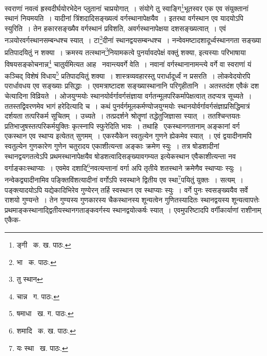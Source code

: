 \documentclass[11pt, openany]{book}
\begin{document}
{\noindent स्वराणां नवत्वं ह्रस्वदीर्घयोरभेदेन प्लुतानां चाप्रयोगात्~। संयोगे तु स्वाङ्गि\renewcommand{\thefootnote}{१}\footnote{ङ्गी \textendash\ क. ख. पाठः.}भूतस्वर एक एव संयुक्तानां स्थानं नियमयति~। यादीनां त्रिंशदादिसङ्ख्यत्वं वर्गस्थानापेक्षयैव~। इतरथा वर्गस्थान एव यादयोऽपि स्युरिति~। तेन हकारसङ्ख्यैव वर्गस्थानं प्रविशति, अवर्गस्थानापेक्षया दशसङ्ख्यत्वात्~। एवं नञयोरवर्गस्थानसम्बन्धश्च स्यात्~। टा\renewcommand{\thefootnote}{२}\footnote{भा \textendash\ क. पाठः.}दीनां स्थानद्वयसम्बन्धश्च~। नन्वेवमष्टादशादूर्ध्वस्थानगता सङ्ख्या प्रतिपादयितुं न शक्या~। क्रमस्य तत्स्थान\renewcommand{\thefootnote}{३}\footnote{तु स्थान}नियामकत्वे पुनर्यावदपेक्षं वक्तुं शक्या, इत्यस्याः परिभाषाया विषयसङ्कोचनान्न\renewcommand{\thefootnote}{४}\footnote{चान्न \textendash\ ग. पाठः.} चातुर्यमित्यत आह \textendash\ {\qt नवान्त्यवर्गे वेति}~। नवानां वर्गस्थानानामन्त्ये वर्गे वा स्वराणां यं कञ्चिद् विशेषं विधाय\renewcommand{\thefootnote}{५}\footnote{षमाधा \textendash\ ख. ग. पाठः.} प्रतिपादयितुं शक्या~। शास्त्रव्यवहारस्तु परार्धादूर्ध्वं न प्रसरति~। लोकवेदयोरपि परार्धावधय एव सङ्ख्याः प्रसिद्धाः~। एवमत्राष्टादश सङ्ख्यास्थानानि परिगृहीतानि~। अतस्तदंश एवैकं दश चेत्यादिना विव्रियते~। ओजयुग्मयोः स्थानयोर्वर्गावर्गसंज्ञाया
वर्गतन्मूलपरिकर्मापेक्षत्वात् तदप्यत्र सूच्यते~। ततस्तद्विवरणमेव भागं हरेदित्यादि च~। कथं पुनर्वर्गमूलकर्मण्योजयुग्मयोः
स्थानयोर्वर्गावर्गसंज्ञाप्रसिद्धिमात्रं दर्शयता तत्परिकर्म सूचितम्~। उच्यते~। तत्प्रदर्शने श्रोतॄणां तद्धेतुजिज्ञासा स्यात्~। ततश्चिन्तयतः प्रतिभाजुषस्तत्परिकर्मयुक्तिः कृत्स्नापि स्फुरेदिति भावः~। तथाहि \textendash\ एकस्थानगतानाम् अङ्कानां वर्ग एकस्थान एव स्थाप्य इत्येतत् सुगमम्~। एकस्यैकेन स्वतुल्येन गुणने ह्येकमेव स्यात्~। एवं द्वयादीनामपि स्वतुल्येन गुणकारेण गुणेन चतुरादय एकाशीत्यन्ता 
अङ्काः क्रमेण स्युः~। तत्र षोडशादीनां स्थानद्वयगतत्वेऽपि प्रथमस्थानापेक्षयैव षोडशत्वादिसङ्ख्यावगम्यत इत्येकस्थान एवैकाशीत्यन्ता नव वर्गाङ्काःस्थाप्याः~। एवमेव दशादि\renewcommand{\thefootnote}{६}\footnote{शमादि \textendash\ क. ख. पाठः.}नवत्यन्तानां वर्गा अपि तृतीये शतस्थाने क्रमेणैव स्थाप्याः स्युः~। नन्वेकद्व्यादीनामिव पङ्क्तिविंशत्यादीनां वर्गोऽपि स्वस्थाने द्वितीय एव स्था\renewcommand{\thefootnote}{७}\footnote{यः स्था \textendash\ ख. पाठः.}पयितुं युक्तः~। सत्यम्~। पङ्क्त्यादयोऽपि यद्येकादिभिरेव गुण्येरन् तर्हि स्वस्थान एव स्थाप्याः स्युः~। वर्गे पुनः स्वसङ्ख्ययैव सर्वे राशयो गुण्यन्ते~। तेन गुण्यस्य गुणकारस्य चैकस्थानस्य शून्यत्वेन गुणितस्यादितः स्थानद्वयस्य शून्यत्वापत्तेः प्रथमाङ्कस्थानाद्द्वितीयस्थानगताङ्कवर्गस्य स्थानद्वयोत्कर्षः स्यात्~। एवमुपरिष्टादपि वर्गीकार्याणां राशीनाम् एकैक-


\newpage

}
\end{document}

